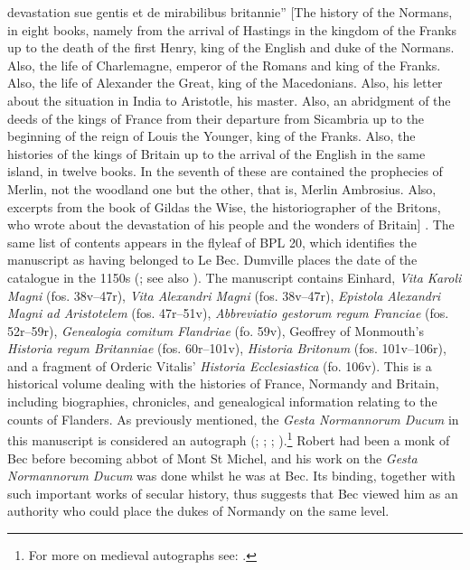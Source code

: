 \begin{paper}
{  devastation sue gentis et de mirabilibus britannie'' [The history of the Normans, in eight books, namely from the arrival of Hastings in the kingdom of the Franks up to the death of the first Henry, king of the English and duke of the Normans. Also, the life of Charlemagne, emperor of the Romans and king of the Franks. Also, the life of Alexander the Great, king of the Macedonians. Also, his letter about the situation in India to Aristotle, his master. Also, an abridgment of the deeds of the kings of France from their departure from Sicambria up to the beginning of the reign of Louis the Younger, king of the Franks. Also, the histories of the kings of Britain up to the arrival of the English in the same island, in twelve books. In the seventh of these are contained the prophecies of Merlin, not the woodland one but the other, that is, Merlin Ambrosius. Also, excerpts from the book of Gildas the Wise, the historiographer of the Britons, who wrote about the devastation of his people and the wonders of Britain] \citep[203; my translation]{pohl_monastic_2017}. The same list of contents appears in the flyleaf of BPL 20,
  which identifies the manuscript as having belonged to Le Bec. Dumville
  places the date of the catalogue in the 1150s (\cite[3]{dumville_early_1985}; see
  also \cite[45--47]{rouse_potens_1991}).} The manuscript contains Einhard,
\emph{Vita Karoli Magni} (fos. 38v--47r), \emph{Vita Alexandri Magni}
(fos. 38v--47r), \emph{Epistola Alexandri Magni ad Aristotelem} (fos.
47r--51v), \emph{Abbreviatio gestorum regum Franciae} (fos. 52r--59r),
\emph{Genealogia comitum Flandriae} (fo. 59v), Geoffrey of Monmouth's
\emph{Historia regum Britanniae} (fos. 60r--101v), \emph{Historia
Britonum} (fos. 101v--106r), and a fragment of Orderic Vitalis'
\emph{Historia Ecclesiastica} (fo. 106v). This is a historical volume
dealing with the histories of France, Normandy and Britain, including
biographies, chronicles, and genealogical information relating to the
counts of Flanders. As previously mentioned, the \emph{Gesta Normannorum
Ducum} in this manuscript is considered an autograph (\cite[cix]{van_houts_gesta_1992}; \cite[24]{crick_historia_1991}; \cite[69]{lieftinck_manuscrits_1964}; \cite[80]{hermans_history_1983}).\footnote{For more on medieval autographs see: \cite{overgaauw_comment_2013}.}
Robert had been a monk of Bec before becoming abbot of Mont St
Michel, and his work on the \emph{Gesta Normannorum Ducum} was done
whilst he was at Bec. Its binding, together with such important works of
secular history, thus suggests that Bec viewed him as an authority who
could place the dukes of Normandy on the same level.


\end{paper}
